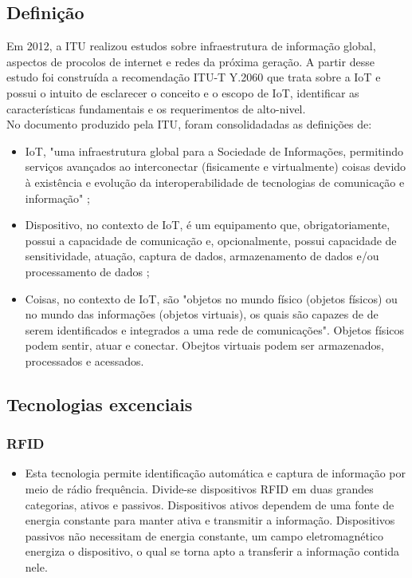 \subsection{Definição}
	Em 2012, a \acrfull{ITU} realizou estudos sobre infraestrutura
	de informação global, aspectos de procolos de internet e redes da próxima geração.
	A partir desse estudo foi construída a recomendação ITU-T Y.2060 \cite{ITU} que trata sobre a \acrlong{IoT}
	e possui o intuito de esclarecer o conceito e o escopo de \acrshort{IoT}, identificar
	as características fundamentais e os requerimentos de alto-nivel.
\\	No documento produzido pela \acrshort{ITU}, foram consolidadadas as definições de:
	\begin{itemize}
		\item \acrlong{IoT}, "uma infraestrutura global para a Sociedade de Informações, permitindo serviços avançados ao
		interconectar (fisicamente e virtualmente) coisas devido à existência e evolução da interoperabilidade
	de tecnologias de comunicação e informação" \cite{ITU};
		\item Dispositivo, no contexto de \acrshort{IoT}, é um equipamento que, obrigatoriamente, possui a capacidade
		de comunicação e, opcionalmente, possui capacidade de sensitividade, atuação, captura de dados,
		armazenamento de dados e/ou processamento de dados \cite{ITU};
		\item Coisas, no contexto de \acrshort{IoT}, são "objetos
	no mundo físico (objetos físicos) ou no mundo das informações (objetos virtuais), os quais são capazes de
	de serem identificados e integrados a uma rede de comunicações". Objetos físicos podem sentir, atuar e conectar.
	Obejtos virtuais podem ser armazenados, processados e acessados.\cite{ITU}
	\end{itemize}
\subsection{Tecnologias excenciais}
	\subsubsection{\acrfull{RFID}}
		\begin{itemize}
			\item Esta tecnologia permite identificação automática e captura de informação por meio de rádio frequência.
			Divide-se dispositivos \acrshort{RFID} em duas grandes categorias, ativos e passivos. Dispositivos ativos dependem
			de uma fonte de energia constante para manter ativa e transmitir a informação. Dispositivos passivos não necessitam de energia constante,
			um campo eletromagnético energiza o dispositivo, o qual se torna apto a transferir a informação contida nele.
			\cite{refrfid}
		\end{itemize}

